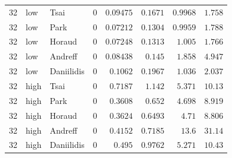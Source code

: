 \begin{longtable}{rllrrrrr}
32 & low & Tsai & 0 & $0.09475$ & $0.1671$ & $0.9968$ & $1.758$ \\
32 & low & Park & 0 & $0.07212$ & $0.1304$ & $0.9959$ & $1.788$ \\
32 & low & Horaud & 0 & $0.07248$ & $0.1313$ & $1.005$ & $1.766$ \\
32 & low & Andreff & 0 & $0.08438$ & $0.145$ & $1.858$ & $4.947$ \\
32 & low & Daniilidis & 0 & $0.1062$ & $0.1967$ & $1.036$ & $2.037$ \\
32 & high & Tsai & 0 & $0.7187$ & $1.142$ & $5.371$ & $10.13$ \\
32 & high & Park & 0 & $0.3608$ & $0.652$ & $4.698$ & $8.919$ \\
32 & high & Horaud & 0 & $0.3624$ & $0.6493$ & $4.71$ & $8.806$ \\
32 & high & Andreff & 0 & $0.4152$ & $0.7185$ & $13.6$ & $31.14$ \\
32 & high & Daniilidis & 0 & $0.495$ & $0.9762$ & $5.271$ & $10.43$ \\
\end{longtable}
\endgroup
